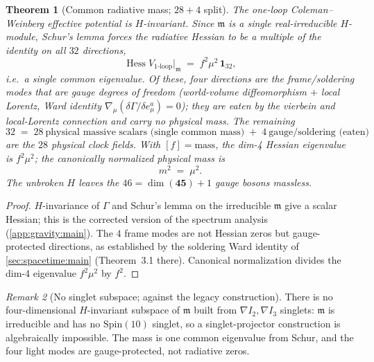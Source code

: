 \documentclass[11pt]{article}
\theoremstyle{plain}
\newtheorem{theorem}{Theorem}[section]
\theoremstyle{definition}
\theoremstyle{remark}
\newtheorem{remark}[theorem]{Remark}
\newcommand{\Hess}{\operatorname{Hess}}
\begin{document}
\begin{theorem}[Common radiative mass; $28+4$ split]
\label{thm:gravity:spectrum}
The one-loop Coleman--Weinberg effective potential is $H$-invariant.
Since $\mathfrak m$ is a single real-irreducible $H$-module, Schur's lemma
forces the radiative Hessian to be a multiple of the identity on all
$32$ directions,
\[
  \Hess V_{\mathrm{1\text{-}loop}}\big|_{\mathfrak m}
  \;=\; f^{2}\mu^{2}\,\mathbf 1_{32},
\]
i.e.\ a single common eigenvalue. Of these, four directions are the
frame/soldering modes that are gauge degrees of freedom (world-volume
diffeomorphism $+$ local Lorentz, Ward identity
$\nabla_{\mu}(\delta\Gamma/\delta e^{a}_{\mu})=0$); they are eaten by the
vierbein and local-Lorentz connection and carry \emph{no} physical mass.
The remaining
\[
  32 \;=\; 28\ \text{physical massive scalars (single common mass)}\;+\;4\ \text{gauge/soldering (eaten)}
\]
are the $28$ physical clock fields. With $[f]=\text{mass}$, the dim-4
Hessian eigenvalue is $f^{2}\mu^{2}$; the canonically normalized physical
mass is
\[
  m^{2} \;=\; \mu^{2}.
\]
The unbroken $H$ leaves the $46=\dim(\mathbf{45})+1$ gauge bosons massless.
\end{theorem}

\begin{proof}
$H$-invariance of $\Gamma$ and Schur's lemma on the irreducible $\mathfrak m$
give a scalar Hessian; this is the corrected version of the spectrum
analysis (\autoref{app:gravity:main}). The $4$ frame modes are not Hessian
zeros but gauge-protected directions, as established by the soldering Ward
identity of \autoref{sec:spacetime:main} (Theorem~3.1 there). Canonical
normalization divides the dim-4 eigenvalue $f^{2}\mu^{2}$ by $f^{2}$.
\end{proof}

\begin{remark}[No singlet subspace; against the legacy construction]
\label{rmk:gravity:nosinglet}
There is no four-dimensional $H$-invariant subspace of $\mathfrak m$ built
from $\nabla I_{2},\nabla I_{3}$ singlets: $\mathfrak m$ is irreducible and
has no $\mathrm{Spin}(10)$ singlet, so a singlet-projector construction is
algebraically impossible. The mass is one common eigenvalue from Schur, and
the four light modes are gauge-protected, not radiative zeros.
\end{remark}
\end{document}
